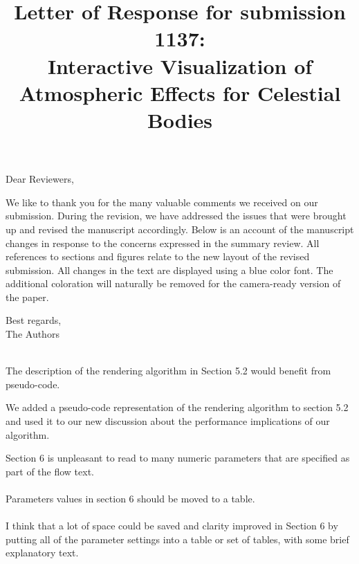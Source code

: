 \documentclass{article}
\date{}
\begin{document}
 
\title{Letter of Response for submission 1137:\\ Interactive Visualization of Atmospheric Effects for Celestial Bodies}
\maketitle
 
Dear Reviewers,
 
\noindent We like to thank you for the many valuable comments we received on our submission.
During the revision, we have addressed the issues that were brought up and revised the manuscript accordingly.
Below is an account of the manuscript changes in response to the concerns expressed in the summary review. All references to sections and figures relate to the new layout of the revised submission. All changes in the text are displayed using a blue color font. The additional coloration will naturally be removed for the camera-ready version of the paper.
 
 
Best regards, \\
The Authors \\\\
 
\newpage

\vspace*{1cm}
\begin{tcolorbox}
The description of the rendering algorithm in Section 5.2 would benefit from pseudo-code.
\end{tcolorbox}

We added a pseudo-code representation of the rendering algorithm to section 5.2 and used it to  our new discussion about the performance implications of our algorithm.
 
\vspace*{1cm}
\begin{tcolorbox}
Section 6 is unpleasant to read to many numeric parameters that are specified as part of the flow text.\\
\\
Parameters values in section 6 should be moved to a table.\\
\\
I think that a lot of space could be saved and clarity improved in Section 6 by putting all of the parameter settings into a table or set of tables, with some brief explanatory text.
\end{tcolorbox}
\end{document}
